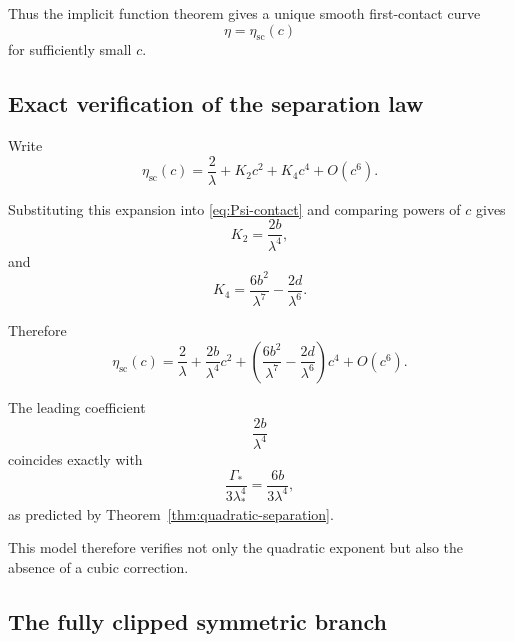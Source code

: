 Thus the implicit function theorem gives a unique smooth
first-contact curve
\[
\eta=\eta_{\mathrm{sc}}(c)
\]
for sufficiently small $c$.

\subsection{Exact verification of the separation law}
\label{subsec:planar-separation}

Write
\begin{equation}
\eta_{\mathrm{sc}}(c)
=
\frac{2}{\lambda}
+
K_2c^2
+
K_4c^4
+
O(c^6).
\label{eq:planar-eta-series}
\end{equation}

Substituting this expansion into
\eqref{eq:Psi-contact} and comparing powers of $c$ gives
\begin{equation}
\boxed{
K_2
=
\frac{2b}{\lambda^4},
}
\label{eq:planar-K2}
\end{equation}
and
\begin{equation}
\boxed{
K_4
=
\frac{6b^2}{\lambda^7}
-
\frac{2d}{\lambda^6}.
}
\label{eq:planar-K4}
\end{equation}

Therefore
\begin{equation}
\boxed{
\eta_{\mathrm{sc}}(c)
=
\frac{2}{\lambda}
+
\frac{2b}{\lambda^4}c^2
+
\left(
\frac{6b^2}{\lambda^7}
-
\frac{2d}{\lambda^6}
\right)c^4
+
O(c^6).
}
\label{eq:planar-separation-final}
\end{equation}

The leading coefficient
\[
\frac{2b}{\lambda^4}
\]
coincides exactly with
\[
\frac{\Gamma_*}{3\lambda_*^4}
=
\frac{6b}{3\lambda^4},
\]
as predicted by
Theorem~\ref{thm:quadratic-separation}.

This model therefore verifies not only the quadratic exponent but
also the absence of a cubic correction.

\subsection{The fully clipped symmetric branch}
\label{subsec:planar-clipped-symmetric}

